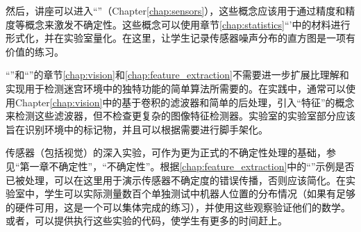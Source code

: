 然后，讲座可以进入“”（Chapter\ref{chap:sensors}），这些概念应该用于通过精度和精度等概念来激发不确定性。这些概念可以使用章节\ref{chap:statistics}``'中的材料进行形式化，并在实验室量化。在这里，让学生记录传感器噪声分布的直方图是一项有价值的练习。

“”和“”的章节\ref{chap:vision}和\ref{chap:feature_extraction}不需要进一步扩展比理解和实现用于检测迷宫环境中的独特功能的简单算法所需要的。在实践中，通常可以使用Chapter\ref{chap:vision}中的基于卷积的滤波器和简单的后处理，引入“特征”的概念来检测这些滤波器，但不检查更复杂的图像特征检测器。实验室的实验室部分应该旨在识别环境中的标记物，并且可以根据需要进行脚手架化。

传感器（包括视觉）的深入实验，可作为更为正式的不确定性处理的基础，参见“第一章不确定性”，“不确定性”。根据\ref{chap:feature_extraction}中的“”示例是否已被处理，可以在这里用于演示传感器不确定度的错误传播，否则应该简化。在实验室中，学生可以实际测量数百个单独测试中机器人位置的分布情况（如果有足够的硬件可用，这是一个可以集体完成的练习），并使用这些观察验证他们的数学。或者，可以提供执行这些实验的代码，使学生有更多的时间赶上。




